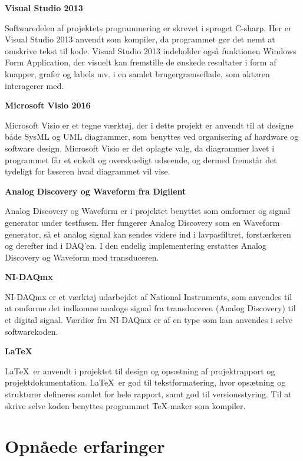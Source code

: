 \textbf{Visual Studio 2013}

Softwaredelen af projektets programmering er skrevet i sproget C-sharp. Her er Visual Studio 2013 anvendt som kompiler, da programmet gør det nemt at omskrive tekst til kode. Visual Studio 2013 indeholder også funktionen Windows Form Application, der visuelt kan fremstille de ønskede resultater i form af knapper, grafer og labels mv. i en samlet brugergrænseflade, som aktøren interagerer med. 

\textbf{Microsoft Visio 2016}

Microsoft Visio er et tegne værktøj, der i dette projekt er anvendt til at designe både SysML og UML diagrammer, som benyttes ved organisering af hardware og software design. Microsoft Visio er det oplagte valg, da diagrammer lavet i programmet får et enkelt og overskueligt udseende, og dermed fremstår det tydeligt for læseren hvad diagrammet vil vise.

\textbf{Analog Discovery og Waveform fra Digilent}

Analog Discovery og Waveform er i projektet benyttet som omformer og signal generator under testfasen. Her fungerer Analog Discovery som en Waveform generator, så et analog signal kan sendes videre ind i lavpasfiltret, forstærkeren og derefter ind i DAQ’en. I den endelig implementering erstattes Analog Discovery og Waveform med transduceren. 

\textbf{NI-DAQmx}

NI-DAQmx er et værktøj udarbejdet af National Instruments, som anvendes til at omforme det indkomne analoge signal fra transduceren (Analog Discovery) til et digital signal. Værdier fra NI-DAQmx er af en type som kan anvendes i selve softwarekoden. 

\textbf{\LaTeX}

\LaTeX\ er anvendt i projektet til design og opsætning af projektrapport og projektdokumentation. \LaTeX\ er god til tekstformatering, hvor opsætning og strukturer defineres samlet for hele rapport, samt god til versionsstyring. Til at skrive selve koden benyttes programmet TeX-maker som kompiler. 

\section{Opnåede erfaringer}

